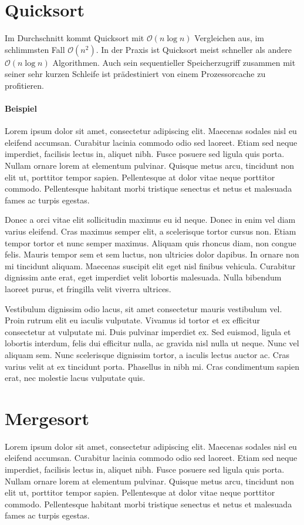 \documentclass[12pt, a4paper, titlepage, hidelinks]{scrreprt}
\begin{document}
\section{Quicksort}

Im Durchschnitt kommt Quicksort mit $\mathcal{O}(n\log{}n)$ Vergleichen aus, im schlimmsten Fall $\mathcal{O}(n^2)$. In der Praxis ist Quicksort meist schneller als andere $\mathcal{O}(n\log{}n)$ Algorithmen. Auch sein sequentieller Speicherzugriff zusammen mit seiner sehr kurzen Schleife ist prädestiniert von einem Prozessorcache zu profitieren.

\paragraph{Beispiel}
Lorem ipsum dolor sit amet, consectetur adipiscing elit. Maecenas sodales nisl eu eleifend accumsan. Curabitur lacinia commodo odio sed laoreet. Etiam sed neque imperdiet, facilisis lectus in, aliquet nibh. Fusce posuere sed ligula quis porta. Nullam ornare lorem at elementum pulvinar. Quisque metus arcu, tincidunt non elit ut, porttitor tempor sapien. Pellentesque at dolor vitae neque porttitor commodo. Pellentesque habitant morbi tristique senectus et netus et malesuada fames ac turpis egestas.

Donec a orci vitae elit sollicitudin maximus eu id neque. Donec in enim vel diam varius eleifend. Cras maximus semper elit, a scelerisque tortor cursus non. Etiam tempor tortor et nunc semper maximus. Aliquam quis rhoncus diam, non congue felis. Mauris tempor sem et sem luctus, non ultricies dolor dapibus. In ornare non mi tincidunt aliquam. Maecenas suscipit elit eget nisl finibus vehicula. Curabitur dignissim ante erat, eget imperdiet velit lobortis malesuada. Nulla bibendum laoreet purus, et fringilla velit viverra ultrices.

Vestibulum dignissim odio lacus, sit amet consectetur mauris vestibulum vel. Proin rutrum elit eu iaculis vulputate. Vivamus id tortor et ex efficitur consectetur at vulputate mi. Duis pulvinar imperdiet ex. Sed euismod, ligula et lobortis interdum, felis dui efficitur nulla, ac gravida nisl nulla ut neque. Nunc vel aliquam sem. Nunc scelerisque dignissim tortor, a iaculis lectus auctor ac. Cras varius velit at ex tincidunt porta. Phasellus in nibh mi. Cras condimentum sapien erat, nec molestie lacus vulputate quis. 

\section{Mergesort}
Lorem ipsum dolor sit amet, consectetur adipiscing elit. Maecenas sodales nisl eu eleifend accumsan. Curabitur lacinia commodo odio sed laoreet. Etiam sed neque imperdiet, facilisis lectus in, aliquet nibh. Fusce posuere sed ligula quis porta. Nullam ornare lorem at elementum pulvinar. Quisque metus arcu, tincidunt non elit ut, porttitor tempor sapien. Pellentesque at dolor vitae neque porttitor commodo. Pellentesque habitant morbi tristique senectus et netus et malesuada fames ac turpis egestas.
\end{document}
